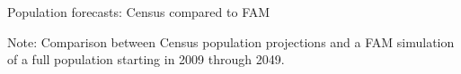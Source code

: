 \begin{table}[H]
\begin{threeparttable}
\caption{Population forecasts: Census compared to FAM}
\label{table:external_pop}
\centering
\footnotesize

\begin{tablenotes}
\footnotesize
\item Note: Comparison between Census population projections and a FAM simulation of a full population starting in 2009 through 2049.
\end{tablenotes}
\end{threeparttable}
\end{table}

